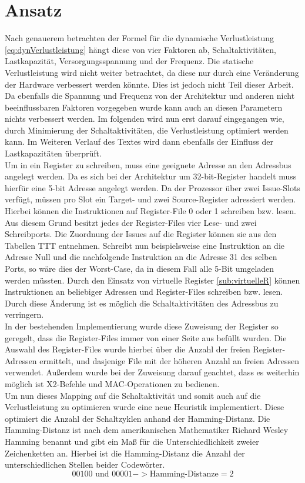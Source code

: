\section{Ansatz}
Nach genauerem betrachten der Formel für die dynamische Verlustleistung \ref{eq:dynVerlustleistung} hängt diese von vier Faktoren ab, Schaltaktivitäten,  Lastkapazität, Versorgungsspannung und der Frequenz. Die statische Verlustleistung wird nicht weiter betrachtet, da diese nur durch eine Veränderung der Hardware verbessert werden könnte. Dies ist jedoch nicht Teil dieser Arbeit. Da ebenfalls die Spannung und Frequenz von der Architektur und anderen nicht beeinflussbaren Faktoren vorgegeben wurde kann auch an diesen Parametern nichts verbessert werden. Im folgenden wird nun erst darauf eingegangen wie, durch Minimierung der Schaltaktivitäten, die Verlustleistung optimiert werden kann. Im Weiteren Verlauf des Textes wird dann ebenfalls der Einfluss der Lastkapazitäten überprüft.\\
Um in ein Register zu schreiben, muss eine geeignete Adresse an den Adressbus angelegt werden. Da es sich bei der Architektur um 32-bit-Register handelt muss hierfür eine 5-bit Adresse angelegt werden.
Da der Prozessor über zwei Issue-Slots verfügt, müssen pro Slot ein Target- und zwei Source-Register adressiert werden. Hierbei können die Instruktionen auf Register-File 0 oder 1 schreiben bzw. lesen. Aus diesem Grund besitzt jedes der Register-Files vier Lese- und zwei Schreibports. Die Zuordnung der Issues auf die Register können sie aus den Tabellen TTT entnehmen. Schreibt nun beispielsweise eine Instruktion an die Adresse Null und die nachfolgende Instruktion an die Adresse 31 des selben Ports, so wäre dies der Worst-Case, da in diesem Fall alle 5-Bit umgeladen werden müssten.
Durch den Einsatz von virtuelle Register \ref{sub:virtuelleR} können Instruktionen an beliebiger Adressen und Register-Files schreiben bzw. lesen. Durch diese Änderung ist es möglich die Schaltaktivitäten des Adressbus zu verringern.\\
In der bestehenden Implementierung wurde diese Zuweisung der Register so geregelt, dass die Register-Files immer von einer Seite aus befüllt wurden. Die Auswahl des Register-Files wurde hierbei über die Anzahl der freien Register-Adressen ermittelt, und dasjenige File mit der höheren Anzahl an freien Adressen verwendet. Außerdem wurde bei der Zuweisung darauf geachtet, dass es weiterhin möglich ist X2-Befehle und MAC-Operationen zu bedienen.\\
Um nun dieses Mapping auf die Schaltaktivität und somit auch auf die Verlustleistung zu optimieren wurde eine neue Heuristik implementiert.
Diese optimiert die Anzahl der Schaltzyklen anhand der Hamming-Distanz.
Die Hamming-Distanz ist nach dem amerikanischen Mathematiker Richard Wesley Hamming benannt und gibt ein Maß für die Unterschiedlichkeit zweier Zeichenketten an. Hierbei ist die Hamming-Distanz die Anzahl der unterschiedlichen Stellen beider Codewörter.
\begin{equation}
00100 \text{ und } 00001 -> \text{Hamming-Distanze}= 2
\label{eq:hammingdistanze}
\end{equation}
 
